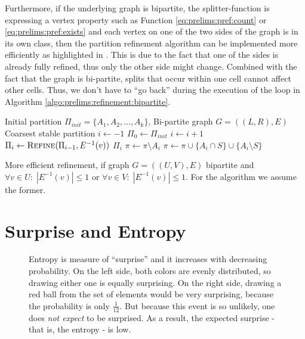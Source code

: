 		Furthermore, if the underlying graph is bipartite, the splitter-function is expressing a vertex property such as Function \ref{eq:prelims:pref:count} or \ref{eq:prelims:pref:exists} and each vertex on one of the two sides of the graph is in its own class, then the partition refinement algorithm can be implemented more efficiently as highlighted in \cite{salvagninDetectingSemanticGroups2016}.
		This is due to the fact that one of the sides is already fully refined, thus only the other side might change. Combined with the fact that the graph is bi-partite, splits that occur within one cell cannot affect other cells.
		Thus, we don't have to \enquote{go back} during the execution of the loop in Algorithm \ref{algo:prelims:refinement:bipartite}.
		
		\begin{algorithm}[ht!]
			\centering
			\begin{algorithmic}
				\Require Initial partition $\Pi_{init} = \{ A_1, A_2, \ldots, A_k \}$, Bi-partite graph $G = ((L, R), E)$
				\Ensure Coarsest stable partition
				\Statex
					\State $i \gets -1$
					\State $\Pi_0 \gets \Pi_{init}$
						\State $i \gets i + 1$
						\State $\Pi_{i} \gets \Call{Refine}{\Pi_{i-1}, E^{-1}(v)}$
					\EndFor
					\State \Return $\Pi_i$
				\EndFunction
				\Statex
						\State $\pi \gets \pi \setminus A_i$
						\State $\pi \gets \pi \cup \{ A_i \cap S \} \cup \{ A_i \setminus S \}$ 
					\EndFor
				\EndFunction
			\end{algorithmic}
			\caption{More efficient refinement, if graph $G=((U, V), E)$ bipartite and $\forall v \in U:\; |E^{-1}(v)| \leq 1$ or $\forall v \in V:\; |E^{-1}(v)| \leq 1$. For the algorithm we assume the former.}
			\label{algo:prelims:refinement:bipartite}
		\end{algorithm}
		
		
	
		\clearpage
	
	\section{Surprise and Entropy}
	
		\begin{figure}[ht!]
			\centering
			
			\caption{Entropy is measure of \enquote{surprise} and it increases with decreasing probability. On the left side, both colors are evenly distributed, so drawing either one is equally surprising. On the right side, drawing a red ball from the set of elements would be very surprising, because the probability is only $\frac{1}{12}$. But because this event is so unlikely, one does \textit{not expect} to be surprised. As a result, the expected surprise - that is, the entropy - is low.}
			\label{figure:prelim:entropy}
		\end{figure}
	
